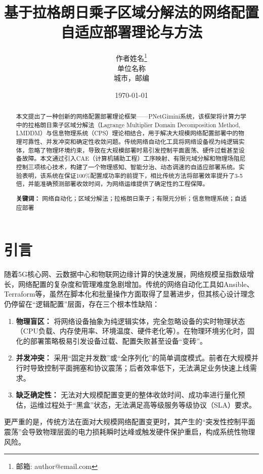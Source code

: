 \documentclass[12pt,a4paper]{article}
\title{\textbf{基于拉格朗日乘子区域分解法的网络配置自适应部署理论与方法}}
\author{作者姓名\thanks{邮箱: author@email.com} \\
        单位名称 \\
        城市，邮编}
\date{\today}
\begin{document}
\maketitle

\begin{abstract}
本文提出了一种创新的网络配置部署理论框架——PNetGimini系统，该框架将计算力学中的拉格朗日乘子区域分解法（Lagrange Multiplier Domain Decomposition Method, LMDDM）与信息物理系统（CPS）理论相结合，用于解决大规模网络配置部署中的物理可靠性、并发冲突和确定性收敛问题。传统网络自动化工具将网络设备视为纯逻辑实体，忽略了物理环境约束，导致在大规模部署时易引发控制平面震荡、硬件过载甚至设备故障。本文通过引入CAE（计算机辅助工程）工序映射、有限元域分解和物理场阻尼控制三项核心技术，构建了一个物理感知、智能分治、动态调速的自适应部署系统。实验表明，该系统在保证100\%配置成功率的前提下，相比传统方法将部署效率提升了3-5倍，并能准确预测部署收敛时间，为网络运维提供了确定性的工程保障。

\textbf{关键词：} 网络自动化；区域分解法；拉格朗日乘子；有限元分析；信息物理系统；自适应部署
\end{abstract}

\section{引言}
\label{sec:introduction}

随着5G核心网、云数据中心和物联网边缘计算的快速发展，网络规模呈指数级增长，网络配置的复杂度和管理难度急剧增加。传统的网络自动化工具如Ansible、Terraform等，虽然在脚本化和批量操作方面取得了显著进步，但其核心设计理念仍停留在“逻辑配置”层面，存在三个根本性缺陷：

\begin{enumerate}
    \item \textbf{物理盲区：} 将网络设备抽象为纯逻辑实体，完全忽略设备的实时物理状态（CPU负载、内存使用率、环境温度、硬件老化等）。在物理环境劣化时，固化的部署策略极易引发设备过载、配置失败甚至设备“变砖”。
    \item \textbf{并发冲突：} 采用“固定并发数”或“全序列化”的简单调度模式。前者在大规模并行时导致控制平面拥塞和协议震荡；后者效率低下，无法满足业务快速上线需求。
    \item \textbf{缺乏确定性：} 无法对大规模配置变更的整体收敛时间、成功率进行量化预估，运维过程处于“黑盒”状态，无法满足高等级服务等级协议（SLA）要求。
\end{enumerate}

更严重的是，传统方法在面对大规模网络配置变更时，其产生的“突发性控制平面震荡”会导致物理层面的电力损耗瞬时达峰或触发硬件保护重启，构成系统性物理风险。
\end{document}

